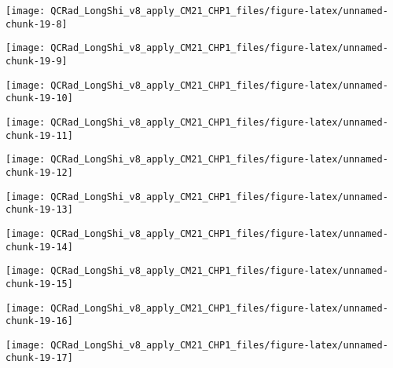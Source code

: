 \documentclass[
  10pt,
  a4paper,oneside]{article}
\begin{document}
\begin{center}\texttt{[image: QCRad\_LongShi\_v8\_apply\_CM21\_CHP1\_files/figure-latex/unnamed-chunk-19-8]} \end{center}

\begin{center}\texttt{[image: QCRad\_LongShi\_v8\_apply\_CM21\_CHP1\_files/figure-latex/unnamed-chunk-19-9]} \end{center}

\begin{center}\texttt{[image: QCRad\_LongShi\_v8\_apply\_CM21\_CHP1\_files/figure-latex/unnamed-chunk-19-10]} \end{center}

\begin{center}\texttt{[image: QCRad\_LongShi\_v8\_apply\_CM21\_CHP1\_files/figure-latex/unnamed-chunk-19-11]} \end{center}

\begin{center}\texttt{[image: QCRad\_LongShi\_v8\_apply\_CM21\_CHP1\_files/figure-latex/unnamed-chunk-19-12]} \end{center}

\begin{center}\texttt{[image: QCRad\_LongShi\_v8\_apply\_CM21\_CHP1\_files/figure-latex/unnamed-chunk-19-13]} \end{center}

\begin{center}\texttt{[image: QCRad\_LongShi\_v8\_apply\_CM21\_CHP1\_files/figure-latex/unnamed-chunk-19-14]} \end{center}

\begin{center}\texttt{[image: QCRad\_LongShi\_v8\_apply\_CM21\_CHP1\_files/figure-latex/unnamed-chunk-19-15]} \end{center}

\begin{center}\texttt{[image: QCRad\_LongShi\_v8\_apply\_CM21\_CHP1\_files/figure-latex/unnamed-chunk-19-16]} \end{center}

\begin{center}\texttt{[image: QCRad\_LongShi\_v8\_apply\_CM21\_CHP1\_files/figure-latex/unnamed-chunk-19-17]} \end{center}
\end{document}
